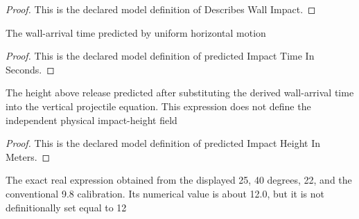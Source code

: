 \begin{proof}
  This is the declared model definition of Describes Wall Impact.
\end{proof}
\begin{definition}
  \label{def:physics:phyx-mini-0740:phyxminiproblems-problemphyxmini0740-predictedimpacttimeinseconds}
  The wall-arrival time predicted by uniform horizontal motion
\end{definition}
\begin{proof}
  This is the declared model definition of predicted Impact Time In Seconds.
\end{proof}
\begin{definition}
  \label{def:physics:phyx-mini-0740:phyxminiproblems-problemphyxmini0740-predictedimpactheightinmeters}
  The height above release predicted after substituting the derived wall-arrival time into the vertical projectile equation. This expression does not define the independent physical impact-height field
\end{definition}
\begin{proof}
  This is the declared model definition of predicted Impact Height In Meters.
\end{proof}
\begin{definition}
  \label{def:physics:phyx-mini-0740:phyxminiproblems-problemphyxmini0740-computedimpactheightinmeters}
  The exact real expression obtained from the displayed 25, 40 degrees, 22, and the conventional 9.8 calibration. Its numerical value is about 12.0, but it is not definitionally set equal to 12
\end{definition}
